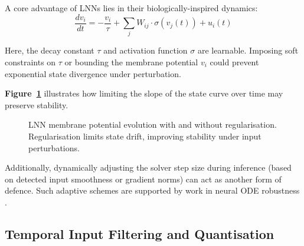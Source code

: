 A core advantage of LNNs lies in their biologically-inspired dynamics:
\begin{equation}
\frac{dv_i}{dt} = -\frac{v_i}{\tau} + \sum_j W_{ij} \cdot \sigma(v_j(t)) + u_i(t)
\end{equation}

Here, the decay constant $\tau$ and activation function $\sigma$ are learnable. Imposing soft constraints on $\tau$ or bounding the membrane potential $v_i$ could prevent exponential state divergence under perturbation.

\textbf{Figure~\ref{fig:lnn_dynamics_defence}} illustrates how limiting the slope of the state curve over time may preserve stability.

\begin{figure}[H]
    \centering
    \caption{LNN membrane potential evolution with and without regularisation. Regularisation limits state drift, improving stability under input perturbations.}
    \label{fig:lnn_dynamics_defence}
    \end{figure}

Additionally, dynamically adjusting the solver step size during inference (based on detected input smoothness or gradient norms) can act as another form of defence. Such adaptive schemes are supported by work in neural ODE robustness \cite{dupont2019augmented, finlay2020trainable}.

\subsection*{Temporal Input Filtering and Quantisation}

